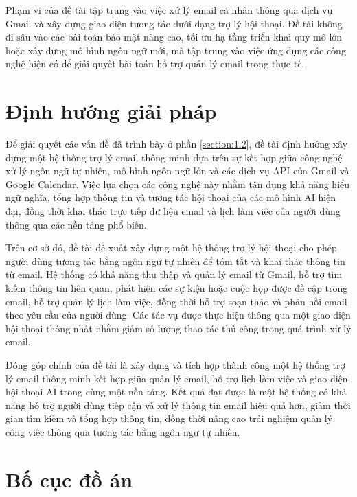 \documentclass[../DoAn.tex]{subfiles}
\begin{document}
Phạm vi của đề tài tập trung vào việc xử lý email cá nhân thông qua dịch vụ Gmail và xây dựng giao diện tương tác dưới dạng trợ lý hội thoại. Đề tài không đi sâu vào các bài toán bảo mật nâng cao, tối ưu hạ tầng triển khai quy mô lớn hoặc xây dựng mô hình ngôn ngữ mới, mà tập trung vào việc ứng dụng các công nghệ hiện có để giải quyết bài toán hỗ trợ quản lý email trong thực tế.


\section{Định hướng giải pháp}
\label{section:1.3}

Để giải quyết các vấn đề đã trình bày ở phần \ref{section:1.2}, đề tài định hướng xây dựng một hệ thống trợ lý email thông minh dựa trên sự kết hợp giữa công nghệ xử lý ngôn ngữ tự nhiên, mô hình ngôn ngữ lớn và các dịch vụ API của Gmail và Google Calendar. Việc lựa chọn các công nghệ này nhằm tận dụng khả năng hiểu ngữ nghĩa, tổng hợp thông tin và tương tác hội thoại của các mô hình AI hiện đại, đồng thời khai thác trực tiếp dữ liệu email và lịch làm việc của người dùng thông qua các nền tảng phổ biến.

Trên cơ sở đó, đề tài đề xuất xây dựng một hệ thống trợ lý hội thoại cho phép người dùng tương tác bằng ngôn ngữ tự nhiên để tóm tắt và khai thác thông tin từ email. Hệ thống có khả năng thu thập và quản lý email từ Gmail, hỗ trợ tìm kiếm thông tin liên quan, phát hiện các sự kiện hoặc cuộc họp được đề cập trong email, hỗ trợ quản lý lịch làm việc, đồng thời hỗ trợ soạn thảo và phản hồi email theo yêu cầu của người dùng. Các tác vụ được thực hiện thông qua một giao diện hội thoại thống nhất nhằm giảm số lượng thao tác thủ công trong quá trình xử lý email.

Đóng góp chính của đề tài là xây dựng và tích hợp thành công một hệ thống trợ lý email thông minh kết hợp giữa quản lý email, hỗ trợ lịch làm việc và giao diện hội thoại AI trong cùng một nền tảng. Kết quả đạt được là một hệ thống có khả năng hỗ trợ người dùng tiếp cận và xử lý thông tin email hiệu quả hơn, giảm thời gian tìm kiếm và tổng hợp thông tin, đồng thời nâng cao trải nghiệm quản lý công việc thông qua tương tác bằng ngôn ngữ tự nhiên.


\section{Bố cục đồ án}
\label{section:1.4}


\end{document}
